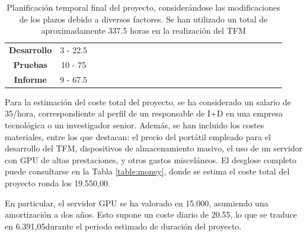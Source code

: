 \begin{table}[h]
{\begin{tabular}{|c|c|ccccccccccccccccccccccc}
    \textbf{Desarrollo} & 3 - 22.5 & \cellcolor[HTML]{FFCCC9} &  & \cellcolor[HTML]{FFCCC9} &  & \cellcolor[HTML]{FFCCC9} &  &  &  &  &  &  &  &  &  &  &  &  &  &  &  &  & \multicolumn{1}{c|}{} &  \\ \cline{1-24}
    \textbf{Pruebas} & 10 - 75 &  & \cellcolor[HTML]{FFCCC9} &  & \cellcolor[HTML]{FFCCC9} &  & \cellcolor[HTML]{FFCCC9} & \cellcolor[HTML]{FFCCC9} & \cellcolor[HTML]{FFCCC9} & \cellcolor[HTML]{FFCCC9} & \cellcolor[HTML]{FFCCC9} & \cellcolor[HTML]{FFCCC9} & \cellcolor[HTML]{FFCCC9} & \cellcolor[HTML]{FFCCC9} &  &  &  &  &  &  &  &  & \multicolumn{1}{c|}{} &  \\ \cline{1-24}
    \textbf{Informe} & 9 - 67.5 &  &  &  &  &  &  &  &  &  &  &  &  &  & \cellcolor[HTML]{FFCCC9} & \cellcolor[HTML]{FFCCC9} & \cellcolor[HTML]{FFCCC9} & \cellcolor[HTML]{FFCCC9} & \cellcolor[HTML]{FFCCC9} & \cellcolor[HTML]{FFCCC9} & \cellcolor[HTML]{FFCCC9} & \cellcolor[HTML]{FFCCC9} & \multicolumn{1}{c|}{\cellcolor[HTML]{FFCCC9}} &  \\ \cline{1-24}
\end{tabular}%
}
\caption[Planificación temporal final del proyecto]{Planificación temporal final del proyecto, considerándose las modificaciones de los plazos debido a diversos factores. Se han utilizado un total de aproximadamente 337.5 horas en la realización del TFM}
\label{table:plan2}
\end{table}

Para la estimación del coste total del proyecto, se ha considerado un salario de 35\officialeuro/hora, correspondiente al perfil de un responsable de I+D en una empresa tecnológica o un investigador senior. Además, se han incluido los costes materiales, entre los que destacan: el precio del portátil empleado para el desarrollo del TFM, dispositivos de almacenamiento masivo, el uso de un servidor con GPU de altas prestaciones, y otros gastos misceláneos. El desglose completo puede consultarse en la Tabla \ref{table:money}, donde se estima el coste total del proyecto ronda los 19.550,00\officialeuro.

En particular, el servidor GPU se ha valorado en 15.000\officialeuro, asumiendo una amortización a dos años. Esto supone un coste diario de 20.55\officialeuro, lo que se traduce en 6.391,05\officialeuro\space durante el periodo estimado de duración del proyecto.


